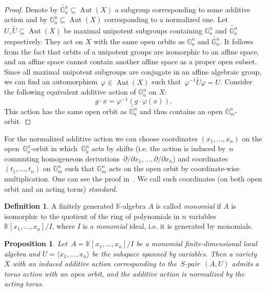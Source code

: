 \documentclass[a4paper,draft,reqno,12pt]{amsart}
\newtheorem{proposition}{Proposition}
\theoremstyle{definition}
\newtheorem{definition}{Definition}
\theoremstyle{definition}
\theoremstyle{remark}
\DeclareMathOperator{\Aut}{Aut}
\def\BG{{\mathbb G}}
\def\BK{{\mathbb K}}
\def\BG{{\mathbb G}}
\def\BK{{\mathbb K}}
\begin{document}
\begin{proof}
    Denote by $\widetilde{\BG_a^n} \subseteq \Aut(X)$ a subgroup corresponding to some additive action and by $\BG_a^n \subseteq \Aut(X)$ corresponding to a normalized one. Let $U, \widetilde{U} \subseteq \Aut(X)$ be maximal unipotent subgroups containing $\BG_a^n$ and $\widetilde{\BG_a^n}$ respectively. They act on $X$ with the same open orbits as $\BG_a^n$ and $\widetilde{\BG_a^n}$. It follows from the fact that orbits of a unipotent groups are isomorphic to an affine space, and an affine space cannot contain another affine space as a proper open subset. Since all maximal unipotent subgroups are conjugate in an affine algebraic group, we can find an automorphism~$\varphi\in\Aut(X)$ such that~$\varphi^{-1}\widetilde{U}\varphi=U$. Consider the following equivalent additive action of $\BG_a^n$ on $X$:\begin{equation*}
        g\cdot x = \varphi^{-1}(g\cdot\varphi(x)).
    \end{equation*} This action has the same open orbit as $\widetilde{\BG_a^n}$ and thus contains an open $\BG_m^n$-orbit.
\end{proof}

For the normalized additive action we can choose coordinates $(x_1,\dotsc,x_n)$ on the open~$\BG_a^n$-orbit in which~$\BG_a^n$ acts by shifts (i.e. the action is induced by~$n$ commuting homogeneous derivations~$\partial/\partial x_1,\dotsc, \partial/\partial x_n$) and coordinates $(t_1,\dotsc,t_n)$ on $\BG_m^n$ such that $\BG_m^n$ acts on the open orbit by coordinate-wise multiplication. One can see the proof in~\cite[Section 4.1]{AZ}. We call such coordinates (on both open orbit and an acting torus) \emph{standard}.

\begin{definition}\label{monomialdefinition}
    A finitely generated $\BK$-algebra $A$ is called \emph{monomial} if $A$ is isomorphic to the quotient of the ring of polynomials in $n$ variables $\BK[x_1,\dotsc,x_n]/I$, where $I$ is a \emph{monomial} ideal, i.e. it is generated by monomials. 
\end{definition}

\begin{proposition}\label{monomialhomo}
    Let~$A=\BK[x_1,\dotsc,x_n]/I$ be a monomial finite-dimensional local algebra and $U=\langle x_1, \dotsc, x_n\rangle$ be the subspace spanned by variables. Then a variety $X$ with an induced additive action corresponding to the~$S$-pair~$(A, U)$ admits a torus action with an open orbit, and the additive action is normalized by the acting torus.
\end{proposition}
\end{document}
